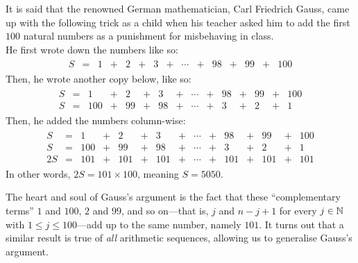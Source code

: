 \begin{boxexample}[Gauss] \label{eg:Gauss_sum}
    It is said that the renowned German mathematician, Carl Friedrich Gauss, came up with the following trick as a child when his teacher asked him to add the first $100$ natural numbers as a punishment for misbehaving in class. \\

    He first wrote down the numbers like so:
    \begin{align*}
        \begin{matrix}
            S & = & 1 & + & 2 & + & 3 & + & \cdots & + & 98 & + & 99 & + & 100
        \end{matrix}
    \end{align*}
    Then, he wrote another copy below, like so:
    \begin{align*}
        \begin{matrix}
            S & = & 1 & + & 2 & + & 3 & + & \cdots & + & 98 & + & 99 & + & 100 \\
            S & = & 100 & + & 99 & + & 98 & + & \cdots & + & 3 & + & 2 & + & 1
        \end{matrix}
    \end{align*}
    Then, he added the numbers column-wise:
    \begin{align*}
        \begin{matrix}
            S & = & 1 & + & 2 & + & 3 & + & \cdots & + & 98 & + & 99 & + & 100 \\
            S & = & 100 & + & 99 & + & 98 & + & \cdots & + & 3 & + & 2 & + & 1 \\
            \hline
            2S & = & 101 & + & 101 & + & 101 & + & \cdots & + & 101 & + & 101 & + & 101
        \end{matrix}
    \end{align*}
    In other words, $2S = 101 \times 100$, meaning $S = 5050$.
\end{boxexample}

The heart and soul of Gauss's argument is the fact that these ``complementary terms'' $1$ and $100$, $2$ and $99$, and so on---that is, $j$ and $n - j + 1$ for every $j \in \mathbb{N}$ with $1 \leq j \leq 100$---add up to the same number, namely $101$. It turns out that a similar result is true of \textit{all} arithmetic sequences, allowing us to generalise Gauss's argument.

